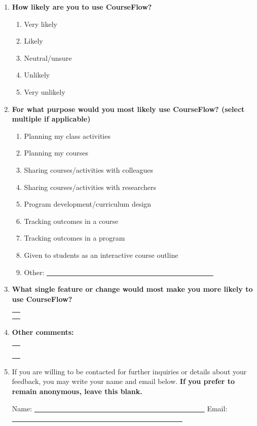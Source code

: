 \documentclass{article}
\begin{document}
\begin{enumerate}
\item \textbf{How likely are you to use CourseFlow?}
\begin{enumerate}
\item Very likely
\item Likely
\item Neutral/unsure
\item Unlikely
\item Very unlikely
\end{enumerate}

\item \textbf{For what purpose would you most likely use CourseFlow?  (select multiple if applicable)}
\begin{enumerate}
\item Planning my class activities
\item Planning my courses
\item Sharing courses/activities with colleagues
\item Sharing courses/activities with researchers
\item Program development/curriculum design
\item Tracking outcomes in a course
\item Tracking outcomes in a program
\item Given to students as an interactive course outline
\item Other: \underline{~~~~~~~~~~~~~~~~~~~~~~~~~~~~~~~~~~~~~~~~~~~~~~~}
\end{enumerate}

\item \textbf{What single feature or change would most make you more likely to use CourseFlow?}

\begin{tabularx}{0.9\textwidth}{X}
\\
\hline
\\
\hline
\\
\hline
\\
\hline
\end{tabularx}

\item \textbf{Other comments:}

\begin{tabularx}{0.9\textwidth}{X}
\\
\hline
\\
\hline
\\
\hline
\\
\hline
\\
\hline
\\
\hline
\end{tabularx}

\item If you are willing to be contacted for further inquiries or details about your feedback, you may write your name and email below. \textbf{If you prefer to remain anonymous, leave this blank.}

Name: \underline{~~~~~~~~~~~~~~~~~~~~~~~~~~~~~~~~~~~~~~~~~~~~~~~~}
Email: \underline{~~~~~~~~~~~~~~~~~~~~~~~~~~~~~~~~~~~~~~~~~~~~~~~~}

\end{enumerate}
\end{document}

